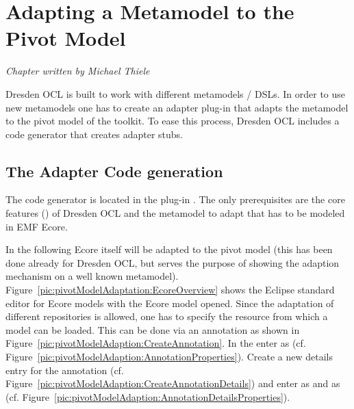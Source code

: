 \chapter{Adapting a Metamodel to the Pivot Model}
\label{chapter:pivotModelAdaptation}

\begin{flushright}
\textit{Chapter written by Michael Thiele}
\end{flushright}

Dresden OCL is built to work with different metamodels / \acs{DSL}s. In order to
use new metamodels one has to create an adapter plug-in that adapts the
metamodel to the pivot model of the toolkit. To ease this process, Dresden OCL
includes a code generator that creates adapter stubs.



\section{The Adapter Code generation}

The code generator is located in the plug-in 
. The only prerequisites are 
the core features () of Dresden OCL and
the metamodel to adapt that has to be modeled in \acs{EMF} Ecore.

In the following Ecore itself will be adapted to the pivot model (this has been 
done already for Dresden OCL, but serves the purpose of showing the adaption
mechanism on a well known metamodel). 
Figure~\ref{pic:pivotModelAdaptation:EcoreOverview} shows the Eclipse standard 
editor for Ecore models with the Ecore model opened. Since the adaptation of 
different repositories is allowed, one has to specify the resource from which a 
model can be loaded. This can be done via an annotation as shown in 
Figure~\ref{pic:pivotModelAdaption:CreateAnnotation}. In the  enter  as 
 (cf. Figure~\ref{pic:pivotModelAdaption:AnnotationProperties}). 
Create a new details entry for the annotation 
(cf. Figure~\ref{pic:pivotModelAdaption:CreateAnnotationDetails}) and enter 
 as  and 
as  (cf. 
Figure~\ref{pic:pivotModelAdaption:AnnotationDetailsProperties}).

